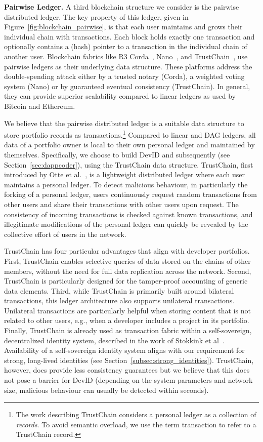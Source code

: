 \textbf{Pairwise Ledger.} A third blockchain structure we consider is the pairwise distributed ledger.
The key property of this ledger, given in Figure~\ref{fig:blockchain_pairwise}, is that each user maintains and grows their individual chain with transactions.
Each block holds exactly one transaction and optionally contains a (hash) pointer to a transaction in the individual chain of another user.
Blockchain fabrics like R3 Corda~\cite{brown2017introducing}, Nano~\cite{lemahieu2017raiblocks}, and TrustChain~\cite{otte2017trustchain}, use pairwise ledgers as their underlying data structure.
These platforms address the double-spending attack either by a trusted notary (Corda), a weighted voting system (Nano) or by guaranteed eventual consistency (TrustChain).
In general, they can provide superior scalability compared to linear ledgers as used by Bitcoin and Ethereum.

We believe that the pairwise distributed ledger is a suitable data structure to store portfolio records as transactions.\footnote{The work describing TrustChain considers a personal ledger as a collection of \emph{records}. To avoid semantic overload, we use the term transaction to refer to a TrustChain record.}
Compared to linear and DAG ledgers, all data of a portfolio owner is local to their own personal ledger and maintained by themselves.
Specifically, we choose to build DevID and subsequently \Dappcoder{} (see Section~\ref{sec:dappcoder}), using the TrustChain data structure.
TrustChain, first introduced by Otte et al.~\cite{otte2017trustchain}, is a lightweight distributed ledger where each user maintains a personal ledger.
To detect malicious behaviour, in particularly the forking of a personal ledger, users continuously request random transactions from other users and share their transactions with other users upon request.
The consistency of incoming transactions is checked against known transactions, and illegitimate modifications of the personal ledger can quickly be revealed by the collective effort of users in the network.

TrustChain has four particular advantages that align with developer portfolios.
First, TrustChain enables selective queries of data stored on the chains of other members, without the need for full data replication across the network.
Second, TrustChain is particularly designed for the tamper-proof accounting of generic data elements.
Third, while TrustChain is primarily built around bilateral transactions, this ledger architecture also supports unilateral transactions.
Unilateral transactions are particularly helpful when storing content that is not related to other users, e.g., when a developer includes a project in its portfolio.
Finally, TrustChain is already used as transaction fabric within a self-sovereign, decentralized identity system, described in the work of Stokkink et al~\cite{stokkink2018deployment}.
Availability of a self-sovereign identity system aligns with our requirement for strong, long-lived identities (see Section~\ref{subsec:strong_identities}).
TrustChain, however, does provide less consistency guarantees but we believe that this does not pose a barrier for DevID (depending on the system parameters and network size, malicious behaviour can usually be detected within seconds).

